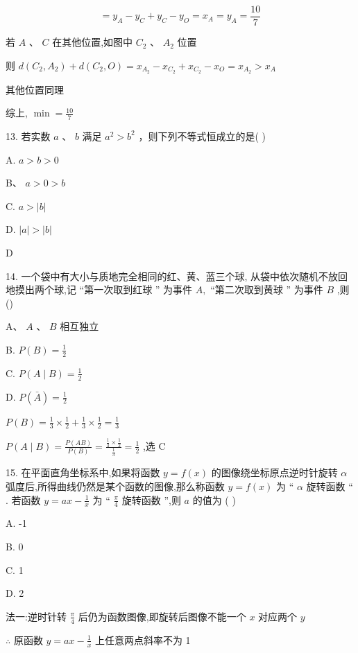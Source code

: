 \documentclass[10pt]{article}
\begin{document}
\[
= {y}_{A} - {y}_{C} + {y}_{C} - {y}_{O} = {x}_{A} = {y}_{A} = \frac{10}{7}
\]

若 \(A\text{ 、 }C\) 在其他位置,如图中 \({C}_{2}\text{ 、 }{A}_{2}\) 位置

则 \(d\left( {{C}_{2},{A}_{2}}\right)  + d\left( {{C}_{2},O}\right)  = {x}_{{A}_{2}} - {x}_{{C}_{2}} + {x}_{{C}_{2}} - {x}_{O} = {x}_{{A}_{2}} > {x}_{A}\)

其他位置同理

综上, \(\min  = \frac{10}{7}\)

13. 若实数 \(a\text{ 、 }b\) 满足 \({a}^{2} > {b}^{2}\) ，则下列不等式恒成立的是( )

A. \(a > b > 0\)

B、 \(a > 0 > b\)

C. \(a > \left| b\right|\)

D. \(\left| a\right|  > \left| b\right|\)

D

14. 一个袋中有大小与质地完全相同的红、黄、蓝三个球, 从袋中依次随机不放回地摸出两个球,记 “第一次取到红球 ” 为事件 \(A,\) “第二次取到黄球 ” 为事件 \(B\) ,则()

A、 \(A\) 、 \(B\) 相互独立

B. \(P\left( B\right)  = \frac{1}{2}\)

C. \(P\left( {A \mid  B}\right)  = \frac{1}{2}\)

D. \(P\left( \bar{A}\right)  = \frac{1}{2}\)

\(P\left( B\right)  = \frac{1}{3} \times  \frac{1}{2} + \frac{1}{3} \times  \frac{1}{2} = \frac{1}{3}\)

\(P\left( {A \mid  B}\right)  = \frac{P\left( {AB}\right) }{P\left( B\right) } = \frac{\frac{1}{3} \times  \frac{1}{2}}{\frac{1}{3}} = \frac{1}{2}\) ,选 C

15. 在平面直角坐标系中,如果将函数 \(y = f\left( x\right)\) 的图像绕坐标原点逆时针旋转 \(\alpha\) 弧度后,所得曲线仍然是某个函数的图像,那么称函数 \(y = f\left( x\right)\) 为 “ \(\alpha\) 旋转函数 “ . 若函数 \(y = {ax} - \frac{1}{x}\) 为 “ \(\frac{\pi }{4}\) 旋转函数 ”,则 \(a\) 的值为 ( )

A. -1

B. 0

C. 1

D. 2

法一:逆时针转 \(\frac{\pi }{4}\) 后仍为函数图像,即旋转后图像不能一个 \(x\) 对应两个 \(y\)

\(\therefore\) 原函数 \(y = {ax} - \frac{1}{x}\) 上任意两点斜率不为 1
\end{document}
